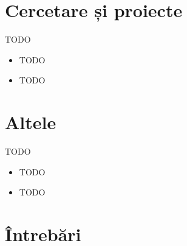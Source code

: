 \documentclass{beamer}
\begin{document}
\section{Cercetare și proiecte}

\begin{frame}{TODO}
	\begin{itemize}
		\item TODO
		\item TODO
	\end{itemize}
\end{frame}

\section{Altele}

\begin{frame}{TODO}
	\begin{itemize}
		\item TODO
		\item TODO
	\end{itemize}
\end{frame}

\section{Întrebări}

\frame{\tableofcontents[currentsection]}
\end{document}
